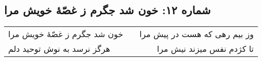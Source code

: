 \begin{center}
\section*{شماره ۱۲: خون شد جگرم ز غصّۀ خویش مرا}
\label{sec:012}
\begin{longtable}{l p{0.5cm} r}
خون شد جگرم ز غصّهٔ خویش مرا
&&
وز بیم رهی که هست در پیش مرا
\\
هرگز نرسد به نوش توحید دلم
&&
تا کژدم نفس میزند نیش مرا
\\
\end{longtable}
\end{center}
